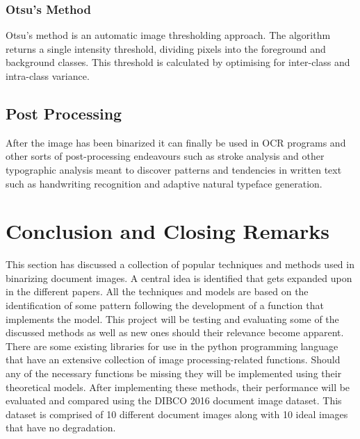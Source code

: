 \documentclass[a4paper, 12pt]{report}
\begin{document}
\subsubsection{Otsu's Method}
Otsu's method is an automatic image thresholding approach. The algorithm returns a single intensity threshold, dividing pixels into the foreground and background classes. This threshold is calculated by optimising for inter-class and intra-class variance.

\subsection{Post Processing}
After the image has been binarized it can finally be used in OCR programs and other sorts of post-processing endeavours such as stroke analysis and other typographic analysis meant to discover patterns and tendencies in written text such as handwriting recognition and adaptive natural typeface generation.

\section{Conclusion and Closing Remarks}
This section has discussed a collection of popular techniques and methods used in binarizing document images. A central idea is identified that gets expanded upon in the different papers. All the techniques and models are based on the identification of some pattern following the development of a function that implements the model.
This project will be testing and evaluating some of the discussed methods as well as new ones should their relevance become apparent. There are some existing libraries for use in the python programming language that have an extensive collection of image processing-related functions. Should any of the necessary functions be missing they will be implemented using their theoretical models.
After implementing these methods, their performance will be evaluated and compared using the DIBCO 2016 document image dataset. This dataset is comprised of 10 different document images along with 10 ideal images that have no degradation.


\end{document}
